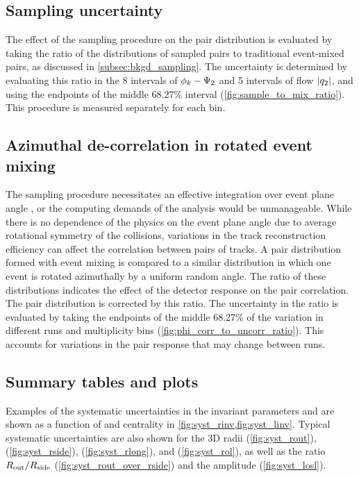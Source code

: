 \subsection{Sampling uncertainty}
The effect of the sampling procedure on the pair distribution is evaluated by taking the ratio of the distributions of sampled pairs to traditional event-mixed pairs, as discussed in \cref{subsec:bkgd_sampling}.
The uncertainty is determined by evaluating this ratio in the 8 intervals of $\phi_{k} - \Psi_{2}$ and 5 intervals of flow $|q_{2}|$, and using the endpoints of the middle 68.27\% interval (\cref{fig:sample_to_mix_ratio}).
This procedure is measured separately for each \kt bin.

\subsection{Azimuthal de-correlation in rotated event mixing}
The sampling procedure necessitates an effective integration over event plane angle \psit, or the computing demands of the analysis would be unmanageable. While there is no dependence of the physics on the event plane angle due to average rotational symmetry of the collisions, variations in the track reconstruction efficiency can affect the correlation between pairs of tracks. A pair distribution formed with event mixing is compared to a similar distribution in which one event is rotated azimuthally by a uniform random angle. The ratio of these distributions indicates the effect of the detector response on the pair correlation. The pair distribution is corrected by this ratio. The uncertainty in the ratio is evaluated by taking the endpoints of the middle 68.27\% of the variation in different runs and multiplicity bins (\cref{fig:phi_corr_to_uncorr_ratio}). This accounts for variations in the pair response that may change between runs.

\FloatBarrier
\subsection{Summary tables and plots}
Examples of the systematic uncertainties in the invariant parameters \Rinv and \linv are shown as a function of \kt and centrality in \cref{fig:syst_rinv,fig:syst_linv}.
Typical systematic uncertainties are also shown for the 3D radii \Rout (\cref{fig:syst_rout}), \Rside (\cref{fig:syst_rside}), \Rlong (\cref{fig:syst_rlong}), and \Rol (\cref{fig:syst_rol}), as well as the ratio $R_{\mathrm{out}} / R_{\mathrm{side}}$ (\cref{fig:syst_rout_over_rside}) and the amplitude (\cref{fig:syst_losl}).

